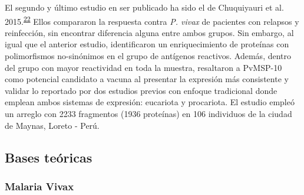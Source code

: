 \documentclass[]{article}
\begin{document}
\begin{enumerate}
  El segundo y último estudio en ser publicado ha sido el de Chuquiyauri
  et al.
  2015.\textsuperscript{\protect\hyperlink{ref-chuquiyauri2015vivax}{22}}
  Ellos compararon la respuesta contra \emph{P. vivax} de pacientes con
  relapsos y reinfección, sin encontrar diferencia alguna entre ambos
  grupos. Sin embargo, al igual que el anterior estudio, identificaron
  un enriquecimiento de proteínas con polimorfismos no-sinónimos en el
  grupo de antígenos reactivos. Además, dentro del grupo con mayor
  reactividad en toda la muestra, resaltaron a PvMSP-10 como potencial
  candidato a vacuna al presentar la expresión más consistente y validar
  lo reportado por dos estudios previos con enfoque tradicional donde
  emplean ambos sistemas de expresión: eucariota y procariota. El
  estudio empleó un arreglo con 2233 fragmentos (1936 proteínas) en 106
  individuos de la ciudad de Maynas, Loreto - Perú.
\end{enumerate}

\subsection{Bases teóricas}\label{bases-teoricas}

\subsubsection{Malaria Vivax}\label{malaria-vivax}
\end{document}
